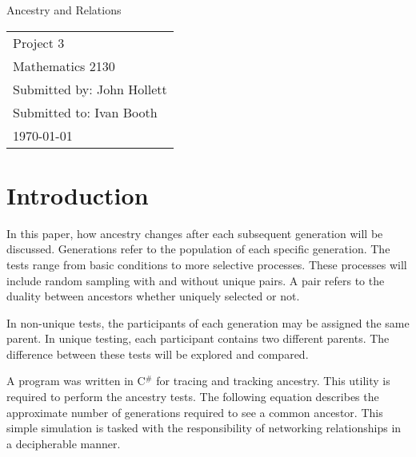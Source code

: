 \documentclass[12pt]{extarticle}
\begin{document}
\begin{titlepage}
\vspace*{2in}
\begin{center}
{\LARGE Ancestry and Relations}
\end{center}

\vspace{2cm}



\vspace{3in}
\begin{flushright}
\begin{tabular}{l}
Project 3 \\
Mathematics 2130\\
Submitted by: John Hollett\\
Submitted to: Ivan Booth\\
\today
\end{tabular}
\end{flushright}


\end{titlepage}


\rfoot{\thepage}




\section{Introduction}
In this paper, how ancestry changes after each subsequent generation will be discussed. Generations refer to the population of each specific generation. The tests range from basic conditions to more selective processes. These processes will include random sampling with and without unique pairs. A pair refers to the duality between ancestors whether uniquely selected or not. 

In non-unique tests, the participants of each generation may be assigned the same parent. In unique testing, each participant contains two different parents. The difference between these tests will be explored and compared.

A program was written in C$^\#$ for tracing and tracking ancestry. This utility is required to perform the ancestry tests. The following equation describes the approximate number of generations required to see a common ancestor. This simple simulation is tasked with the responsibility of networking relationships in a decipherable manner.
\end{document}
